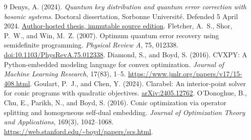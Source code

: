 \begin{thebibliography}{9}
 Denys, A. (2024). \emph{Quantum key distribution and quantum error correction with bosonic systems}. Doctoral dissertation, Sorbonne Universit\'e. Defended 5 April 2024. \href{https://github.com/aurelie-denys/aurelie-denys.github.io/blob/5aefd7b6caca97df7bf49ece36c6c91ba955d0fc/PhDThesisAurelieDenys.pdf}{Author-hosted thesis, immutable source edition}.
 Fletcher, A.~S., Shor, P.~W., and Win, M.~Z. (2007). Optimum quantum error recovery using semidefinite programming. \emph{Physical Review A}, 75, 012338. \href{https://doi.org/10.1103/PhysRevA.75.012338}{doi:10.1103/PhysRevA.75.012338}.
 Diamond, S., and Boyd, S. (2016). CVXPY: A Python-embedded modeling language for convex optimization. \emph{Journal of Machine Learning Research}, 17(83), 1--5. \url{https://www.jmlr.org/papers/v17/15-408.html}.
 Goulart, P.~J., and Chen, Y. (2024). Clarabel: An interior-point solver for conic programs with quadratic objectives. \href{https://arxiv.org/abs/2405.12762}{arXiv:2405.12762}.
 O'Donoghue, B., Chu, E., Parikh, N., and Boyd, S. (2016). Conic optimization via operator splitting and homogeneous self-dual embedding. \emph{Journal of Optimization Theory and Applications}, 169(3), 1042--1068. \url{https://web.stanford.edu/~boyd/papers/scs.html}.
\end{thebibliography}
